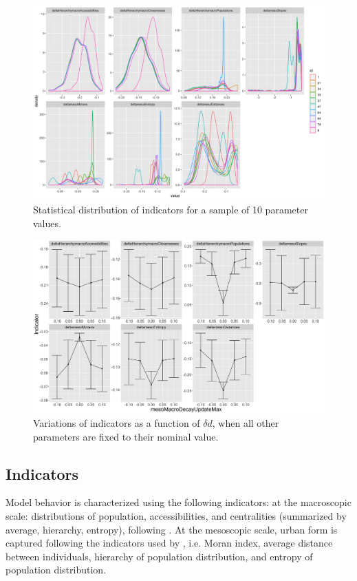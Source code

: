 \documentclass[11pt]{article}
\begin{document}
\begin{figure}[h!]
	\includegraphics[width=\linewidth]{allindics_hist.png}
	\caption{Statistical distribution of indicators for a sample of 10 parameter values.\label{fig:fig2}}
\end{figure}

\begin{figure}[h!]
	\includegraphics[width=\linewidth]{onefactor_allindics_mesoMacroDecayUpdateMax_errorbars.png}
	\caption{Variations of indicators as a function of $\delta d$, when all other parameters are fixed to their nominal value.\label{fig:fig3}}
\end{figure}


\subsection{Indicators}

Model behavior is characterized using the following indicators: at the  macroscopic scale: distributions of population, accessibilities, and centralities (summarized by average, hierarchy, entropy), following \cite{raimbault2020unveiling}. At the mesoscopic scale, urban form is captured following the indicators used by \cite{raimbault2018calibration}, i.e. Moran index, average distance between individuals, hierarchy of population distribution, and entropy of population distribution.
\end{document}
